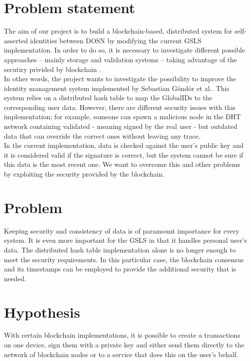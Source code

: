 \documentclass[paper=a4, fontsize=11pt]{scrartcl} %
\numberwithin{equation}{section} %
\numberwithin{figure}{section} %
\numberwithin{table}{section} %
\begin{document}
\section{Problem statement}
The aim of our project is to build a blockchain-based, distributed system for self-asserted identities between DOSN \cite{blockchain-id-mgmt2017} by modifying the current GSLS implementation. In order to do so, it is necessary to investigate different possible approaches -- mainly storage and validation systems -- taking advantage of the secutiry privided by blockchain \cite{nakamoto2008bitcoin}. 
\\

In other words, the project wants to investigate the possibility to improve the identity management system implemented by Sebastian G{\"o}nd{\"o}r et al.\cite{gondor2016distributed}. This system relies on a distributed hash table to map the GlobalIDs to the corresponding user data. However, there are different security issues with this implementation; for example, someone can spawn a malicious node in the DHT network containing validated - meaning signed by the real user - but outdated data that can override the correct ones without leaving any trace. 
\\

In the current implementation, data is checked against the user’s public key and it is considered valid if the signature is correct, but the system cannot be sure if this data is the most recent one. We want to overcome this and other problems by exploiting the security provided by the blockchain. 

\section{Problem}
Keeping security and consistency of data is of paramount importance for every system. It is even more important for the GSLS in that it handles personal user's data.  The distributed hash table implementation alone is no longer enough to meet the security requirements. In this particular case, the blockchain consensus and its timestamps can be employed to provide the additional security that is needed. 

\section{Hypothesis}
With certain blockchain implementations, it is possible to create a transactions \cite{wood2014ethereum} on one device, sign them with a private key and either send them directly to the network of blockchain nodes or to a service that does this on the user's behalf. \\
\end{document}
